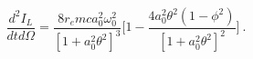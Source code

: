 \begin{equation}\label{ct99-20}
\frac{d^2I_L}{dtd\Omega}=\frac{8r_{e}mca_0^2\omega _0^2}{[1+a_0^2 \theta ^2]^3}\Big[1-\frac{4a_0^2\theta ^2(1-\phi ^2)}{[1+a_0^2\theta ^2]^2}\Big]~.
\end{equation}

